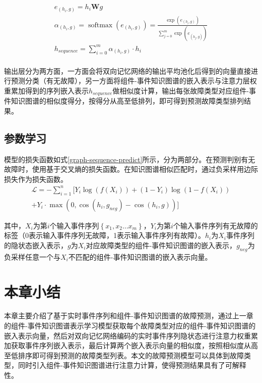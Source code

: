 \begin{equation}
    \begin{array}{l}
    e_{(h_{i} , g)} = h_{i}\mathbf{W}g\\
    \alpha_{(h_{i} , g)}=\operatorname{softmax}\left(e_{(h_{i} , g)}\right)=\frac{\exp \left(e_{(h_{i} , g)}\right)}{\sum_{j=0}^{m}  \exp \left(e_{\left(h_{j} , g\right )}\right)}\\
    h_{sequence} = \sum_{i=0}^{m}\alpha_{(h_{i} , g)}\cdot h_{i}\\
    \end{array}
    \label{sequence-hidden}
\end{equation}

输出层分为两方面，一方面会将双向记忆网络的输出平均池化后得到的向量直接进行预测分类（有无故障），另一方面将组件-事件知识图谱的嵌入表示与注意力层权重累加得到的序列嵌入表示$h_{sequence}$做相似度计算，输出每张故障类型对应组件-事件知识图谱的相似度得分，按得分从高至低排列，即可得到预测故障类型排列结果。

\subsection{参数学习}
模型的损失函数如式\ref{graph-sequence-predict}所示，分为两部分。在预测判别有无故障时，使用基于交叉熵的损失函数。在知识图谱相似匹配时，通过负采样用边际损失作为损失函数。
\begin{equation}
    \begin{aligned}
        \mathcal{L}=-\sum_{i=1}^{n}[Y_{i} \log \left(f\left(X_{i} \right)\right)
        +\left(1-Y_{i}\right) \log \left(1-f\left(X_{i} \right)\right)\\
+Y_{i}\cdot \max \left (0, \cos \left (h_{i}, g_{neg} \right ) - \cos \left (h_{i}, g \right )\right )]
    \end{aligned}
    \label{graph-sequence-predict}
\end{equation}

其中，$X_{i}$为第$i$个输入事件序列$\left\{x_{1}, x_{2} \ldots x_{m}\right\}$，$Y_{i}$为第$i$个输入事件序列有无故障的标签（0表示输入事件序列无故障，1表示输入事件序列有故障）。$h_{i}$为$X_{i}$事件序列的隐状态嵌入表示，$g$为$X_{i}$对应故障类型的组件-事件知识图谱的嵌入表示，$g_{neg}$为负采样任意一个与$X_{i}$不匹配的组件-事件知识图谱的嵌入表示向量。

\section{本章小结}
本章主要介绍了基于实时事件序列和组件-事件知识图谱的故障预测，通过上一章的组件-事件知识图谱表示学习模型获取每个故障类型对应的组件-事件知识图谱的嵌入表示向量，然后对双向记忆网络编码的实时事件序列隐状态进行注意力权重累加获取事件序列嵌入表示，最后计算两个嵌入表示向量的相似度，按照相似度从高至低排序即可得到预测的故障类型列表。本文的故障预测模型可以具体到故障类型，同时引入组件-事件知识图谱进行注意力计算，使得预测结果具有了可解释性。